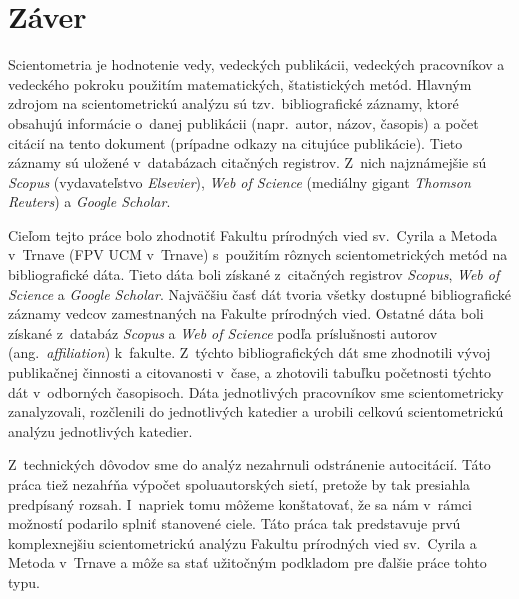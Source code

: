 \chapter*{Záver}

Scientometria je hodnotenie vedy, vedeckých publikácii, vedeckých pracovníkov a
vedeckého pokroku použitím matematických, štatistických metód.  Hlavným zdrojom
na scientometrickú analýzu sú tzv.~bibliografické záznamy, ktoré obsahujú
informácie o~danej publikácii (napr.~autor, názov, časopis) a počet citácií na
tento dokument (prípadne odkazy na citujúce publikácie).  Tieto záznamy sú
uložené v~databázach citačných registrov.  Z~nich najznámejšie sú \emph{Scopus}
(vydavateľstvo \emph{Elsevier}), \emph{Web of Science} (mediálny gigant
\emph{Thomson Reuters}) a \emph{Google Scholar}.

Cieľom tejto práce bolo zhodnotiť Fakultu prírodných vied sv.~Cyrila a Metoda
v~Trnave (FPV UCM v~Trnave) s~použitím rôznych scientometrických metód na
bibliografické dáta.  Tieto dáta boli získané z~citačných registrov
\emph{Scopus}, \emph{Web of Science} a \emph{Google Scholar}.  Najväčšiu časť
dát tvoria všetky dostupné bibliografické záznamy vedcov zamestnaných na Fakulte
prírodných vied.  Ostatné dáta boli získané z~databáz \emph{Scopus} a \emph{Web
  of Science} podľa príslušnosti autorov (ang.~\emph{affiliation}) k~fakulte.
Z~týchto bibliografických dát sme zhodnotili vývoj publikačnej činnosti a
citovanosti v~čase, a zhotovili tabuľku početnosti týchto dát v~odborných
časopisoch.  Dáta jednotlivých pracovníkov sme scientometricky zanalyzovali,
rozčlenili do jednotlivých katedier a urobili celkovú scientometrickú analýzu
jednotlivých katedier.

Z~technických dôvodov sme do analýz nezahrnuli odstránenie autocitácií.  Táto
práca tiež nezahŕňa výpočet spoluautorských sietí, pretože by tak presiahla
predpísaný rozsah.  I~napriek tomu môžeme konštatovať, že sa nám v~rámci
možností podarilo splniť stanovené ciele.  Táto práca tak predstavuje prvú
komplexnejšiu scientometrickú analýzu Fakultu prírodných vied sv.~Cyrila a
Metoda v~Trnave a môže sa stať užitočným podkladom pre ďalšie práce tohto typu.


